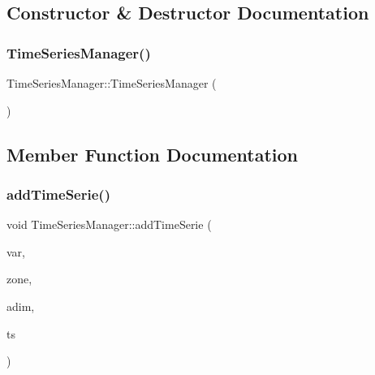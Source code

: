\subsection{Constructor \& Destructor Documentation}
\mbox{\label{classdisplace_1_1simulation_1_1_time_series_manager_a906c14b53caf1c72df0460f2aaf6bc32}} 
\subsubsection{\texorpdfstring{TimeSeriesManager()}{TimeSeriesManager()}}
{\footnotesize\ttfamily Time\+Series\+Manager\+::\+Time\+Series\+Manager (\begin{DoxyParamCaption}{ }\end{DoxyParamCaption})}



\subsection{Member Function Documentation}
\mbox{\label{classdisplace_1_1simulation_1_1_time_series_manager_a46213ef3b8dea4dd2f959e946c11fda1}} 
\subsubsection{\texorpdfstring{addTimeSerie()}{addTimeSerie()}}
{\footnotesize\ttfamily void Time\+Series\+Manager\+::add\+Time\+Serie (\begin{DoxyParamCaption}\item[{\mbox{\hyperlink{classdisplace_1_1simulation_1_1_time_series_manager_ae4e516e8c6ce2707d48ffafec4613ece}{Time\+Series\+Manager\+::\+Variables}}}]{var,  }\item[{int}]{zone,  }\item[{int}]{adim,  }\item[{std\+::shared\+\_\+ptr$<$ \mbox{\hyperlink{classdisplace_1_1simulation_1_1_time_series}{Time\+Series}} $>$}]{ts }\end{DoxyParamCaption})}

